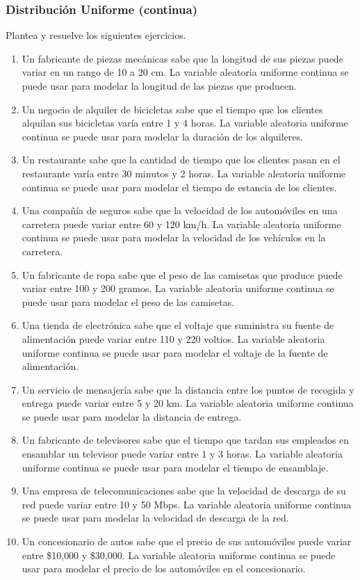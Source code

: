 \subsubsection{Distribución Uniforme (continua)}
\begin{Ejer} 
Plantea y resuelve los siguientes ejercicios.

\begin{enumerate}
    \item Un fabricante de piezas mecánicas sabe que la longitud de sus piezas puede variar en un rango de 10 a 20 cm. La variable aleatoria uniforme continua se puede usar para modelar la longitud de las piezas que producen.
    \item Un negocio de alquiler de bicicletas sabe que el tiempo que los clientes alquilan sus bicicletas varía entre 1 y 4 horas. La variable aleatoria uniforme continua se puede usar para modelar la duración de los alquileres.
    \item Un restaurante sabe que la cantidad de tiempo que los clientes pasan en el restaurante varía entre 30 minutos y 2 horas. La variable aleatoria uniforme continua se puede usar para modelar el tiempo de estancia de los clientes.
    \item Una compañía de seguros sabe que la velocidad de los automóviles en una carretera puede variar entre 60 y 120 km/h. La variable aleatoria uniforme continua se puede usar para modelar la velocidad de los vehículos en la carretera.
    \item Un fabricante de ropa sabe que el peso de las camisetas que produce puede variar entre 100 y 200 gramos. La variable aleatoria uniforme continua se puede usar para modelar el peso de las camisetas.
    \item Una tienda de electrónica sabe que el voltaje que suministra su fuente de alimentación puede variar entre 110 y 220 voltios. La variable aleatoria uniforme continua se puede usar para modelar el voltaje de la fuente de alimentación.
    \item Un servicio de mensajería sabe que la distancia entre los puntos de recogida y entrega puede variar entre 5 y 20 km. La variable aleatoria uniforme continua se puede usar para modelar la distancia de entrega.
    \item Un fabricante de televisores sabe que el tiempo que tardan sus empleados en ensamblar un televisor puede variar entre 1 y 3 horas. La variable aleatoria uniforme continua se puede usar para modelar el tiempo de ensamblaje.
    \item Una empresa de telecomunicaciones sabe que la velocidad de descarga de su red puede variar entre 10 y 50 Mbps. La variable aleatoria uniforme continua se puede usar para modelar la velocidad de descarga de la red.
    \item Un concesionario de autos sabe que el precio de sus automóviles puede variar entre \$10{,}000 y \$30{,}000. La variable aleatoria uniforme continua se puede usar para modelar el precio de los automóviles en el concesionario.
\end{enumerate}
\end{Ejer}

